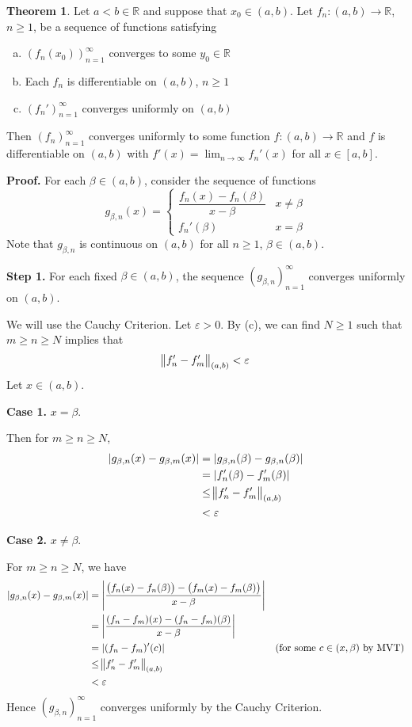 \documentclass[11pt]{article}
\theoremstyle{definition}
\newtheorem{thm}{Theorem}[section]
\newcommand{\mbR}{\ensuremath{\mathbb{R}}}
\begin{document}
\begin{thm}
Let $a < b \in \mbR$ and suppose that $x_0 \in (a, b)$. Let $f_n : (a, b) \to \mbR$, $n \geq 1$, be a sequence of functions satisfying
\begin{enumerate}[(a)] \vspace{-0.2cm}
\item $\left(f_n(x_0)\right)_{n=1}^\infty$ converges to some $y_0 \in \mbR$
\item Each $f_n$ is differentiable on $(a, b)$, $n \geq 1$
\item $(f_n')_{n=1}^\infty$ converges uniformly on $(a, b)$
\end{enumerate}
Then $(f_n)_{n=1}^\infty$ converges uniformly to some function $f : (a, b) \to \mbR$ and $f$ is differentiable on $(a, b)$ with $f'(x) = \lim_{n\to\infty} f_n'(x)$ for all $x \in [a, b]$.
\end{thm}
\textbf{Proof.} For each $\beta \in (a, b)$, consider the sequence of functions
$$g_{\beta, n}(x) = \begin{cases} \dfrac{f_n(x) - f_n(\beta)}{x-\beta} & x \ne \beta \\ f_n'(\beta) & x = \beta \end{cases}$$
Note that $g_{\beta, n}$ is continuous on $(a, b)$ for all $n \geq 1$, $\beta \in (a, b)$. 

\textbf{Step 1.} For each fixed $\beta \in (a, b)$, the sequence $(g_{\beta, n})_{n=1}^\infty$ converges uniformly on $(a, b)$. 

We will use the Cauchy Criterion. Let $\varepsilon > 0$. By (c), we can find $N \geq 1$ such that $m \geq n \geq N$ implies that
$$\norm{f_n' - f_m'}_{(a, b)} < \varepsilon$$
Let $x \in (a, b)$. 

\textbf{Case 1.} $x = \beta$. 

Then for $m \geq n \geq N$, 
\begin{align*}
|g_{\beta, n}(x) - g_{\beta, m}(x)| & = |g_{\beta, n}(\beta) - g_{\beta, n}(\beta)| \\
& = |f_n'(\beta) - f_m'(\beta)| \\
& \leq \norm{f_n' - f_m'}_{(a, b)} \\
& < \varepsilon
\end{align*}

\textbf{Case 2.} $x \ne \beta$.

For $m \geq n \geq N$, we have
\begin{align*}
|g_{\beta, n}(x) - g_{\beta, m}(x)| & = \left| \frac{ \left(f_n(x) - f_n(\beta)\right) - \left(f_m(x) - f_m(\beta)\right)}{x - \beta} \right| \\
& = \left| \frac{(f_n - f_m)(x) - (f_n - f_m)(\beta)}{x - \beta}\right| \\
& = |(f_n - f_m)'(c)| & \text{(for some $c \in (x, \beta)$ by MVT)} \\
& \leq \norm{f_n' - f_m'}_{(a, b)} \\
& < \varepsilon
\end{align*}
Hence $(g_{\beta, n})_{n=1}^\infty$ converges uniformly by the Cauchy Criterion. 
\end{document}
